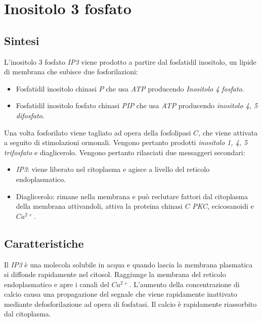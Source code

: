 \section{Inositolo 3 fosfato}

	\subsection{Sintesi}
	L'inositolo $3$ fosfato \emph{IP3} viene prodotto a partire dal fosfatidil inositolo, un lipide di membrana che subisce due fosforilazioni:
	\begin{multicols}{2}
		\begin{itemize}
			\item Fosfatidil inositolo chinasi $P$ che usa \emph{ATP} producendo \emph{Inositolo 4 fosfato}.
			\item Fosfatidil inositolo fosfato chinasi \emph{PIP} che usa \emph{ATP} producendo \emph{inositolo 4, 5 difosfato}.
		\end{itemize}
	\end{multicols}
	Una volta fosforilato viene tagliato ad opera della fosfolipasi $C$, che viene attivata a seguito di stimolazioni ormonali.
	Vengono pertanto prodotti \emph{inositolo 1, 4, 5 trifosfato} e diaglicerolo.
	Vengono pertanto rilasciati due messaggeri secondari:
	\begin{multicols}{2}
		\begin{itemize}
			\item \emph{IP3}: viene liberato nel citoplasma e agisce a livello del reticolo endoplasmatico.
			\item Diaglicerolo: rimane nella membrana e pu\`o reclutare fattori dal citoplasma della membrana attivandoli, attiva la proteina chinasi $C$ \emph{PKC}, ecicosanoidi e \emph{$Ca^{2+}$}.
		\end{itemize}
	\end{multicols}

	\subsection{Caratteristiche}
	Il \emph{IP3} \`e una molecola solubile in acqua e quando lascia la membrana plasmatica si diffonde rapidamente nel citosol.
	Raggiunge la membrana del reticolo endoplasmatico e apre i canali del \emph{$Ca^{2+}$}.
	L'aumento della concentrazione di calcio causa una propagazione del segnale che viene rapidamente inattivato mediante defosforilazione ad opera di fosfatasi.
	Il calcio \`e rapidamente riassorbito dal citoplasma.

